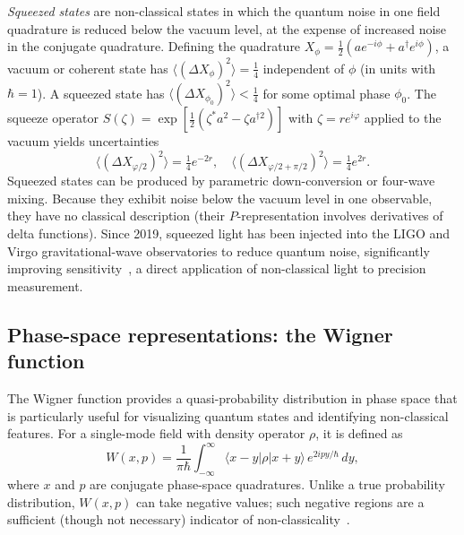 \documentclass{iopjournal}
\begin{document}
\textit{Squeezed states} are non-classical states in which the quantum noise in one field quadrature is reduced below the vacuum level, at the expense of increased noise in the conjugate quadrature. Defining the quadrature $X_\phi = \tfrac{1}{2}(a e^{-i\phi} + a^\dagger e^{i\phi})$, a vacuum or coherent state has $\langle(\Delta X_\phi)^2\rangle = \tfrac{1}{4}$ independent of $\phi$ (in units with $\hbar = 1$). A squeezed state has $\langle(\Delta X_{\phi_0})^2\rangle < \tfrac{1}{4}$ for some optimal phase $\phi_0$. The squeeze operator $S(\zeta) = \exp[\tfrac{1}{2}(\zeta^* a^2 - \zeta a^{\dagger 2})]$ with $\zeta = r e^{i\varphi}$ applied to the vacuum yields uncertainties
\begin{equation}
\langle (\Delta X_{\varphi/2})^2 \rangle = \tfrac{1}{4} e^{-2r}, \quad
\langle (\Delta X_{\varphi/2 + \pi/2})^2 \rangle = \tfrac{1}{4} e^{2r}.
\label{eq:squeeze}
\end{equation}
Squeezed states can be produced by parametric down-conversion or four-wave mixing. Because they exhibit noise below the vacuum level in one observable, they have no classical description (their $P$-representation involves derivatives of delta functions). Since 2019, squeezed light has been injected into the LIGO and Virgo gravitational-wave observatories to reduce quantum noise, significantly improving sensitivity~\cite{aasi2013, tse2019}, a direct application of non-classical light to precision measurement.


\subsection{Phase-space representations: the Wigner function}
\label{sec:wigner}

The Wigner function provides a quasi-probability distribution in phase space that is particularly useful for visualizing quantum states and identifying non-classical features. For a single-mode field with density operator $\rho$, it is defined as~\cite{wigner1932}
\begin{equation}
W(x, p) = \frac{1}{\pi\hbar} \int_{-\infty}^{\infty} \langle x - y | \rho | x + y \rangle \, e^{2ipy/\hbar} \, dy,
\label{eq:wigner_def}
\end{equation}
where $x$ and $p$ are conjugate phase-space quadratures. Unlike a true probability distribution, $W(x,p)$ can take negative values; such negative regions are a sufficient (though not necessary) indicator of non-classicality~\cite{hudson1974}.
\end{document}
